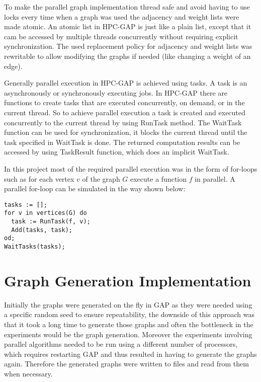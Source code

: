 \documentclass{report}
\theoremstyle{plain}
\theoremstyle{definition}
\theoremstyle{remark}
\begin{document}
To make the parallel graph implementation thread safe and avoid having to use locks every time when a graph was used the adjacency and weight lists were made atomic. An atomic list in HPC-GAP is just like a plain list, except that it cam be accessed by multiple threads concurrently without requiring explicit synchronization. The used replacement policy for adjacency and weight lists was rewritable to allow modifying the graphs if needed (like changing a weight of an edge).

Generally parallel execution in HPC-GAP is achieved using tasks. A task is an asynchronously or synchronously executing jobs. In HPC-GAP there are functions to create tasks that are executed concurrently, on demand, or in the current thread. So to achieve parallel execution a task is created and executed concurrently to the current thread by using RunTask method. The WaitTask function can be used for synchronization, it blocks the current thread until the task specified in WaitTask is done. The returned computation results can be accessed by using TaskResult function, which does an implicit WaitTask.

In this project most of the required parallel execution was in the form of for-loops such as for each vertex $v$ of the graph $G$ execute a function $f$ in parallel. A parallel for-loop can be simulated in the way shown below:

\begin{lstlisting}
tasks := [];
for v in vertices(G) do
  task := RunTask(f, v);
  Add(tasks, task);
od;
WaitTasks(tasks);
\end{lstlisting}

\section{Graph Generation Implementation}

Initially the graphs were generated on the fly in GAP as they were needed  using a specific random seed to ensure repeatability, the downside of this approach was that it took a long time to generate those graphs and often the bottleneck in the experiments would be the graph generation. Moreover the experiments involving parallel algorithms needed to be run using a different number of processors, which requires restarting GAP and thus resulted in having to generate the graphs again. Therefore the generated graphs were written to files and read from them when necessary.
\end{document}
